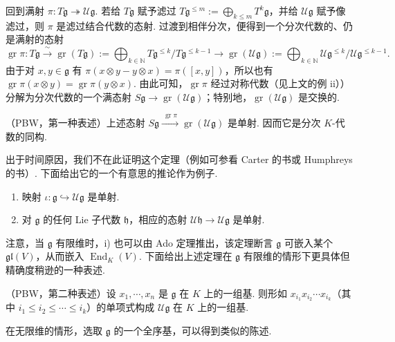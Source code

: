 \begin{numpara}\label{np:ssl-2-2-4}
回到满射 $\pi : T\mathfrak g \twoheadrightarrow \mathcal{U}\mathfrak g$. 若给 $T\mathfrak g$ 赋予滤过 $T\mathfrak g^{\leqslant m} := \bigoplus_{k \leqslant m} T^{k}\mathfrak g$，并给 $\mathcal{U}\mathfrak g$ 赋予像滤过，则 $\pi$ 是滤过结合代数的态射. 过渡到相伴分次，便得到一个分次代数的、仍是满射的态射
\[\operatorname{gr}\pi : T\mathfrak g \xrightarrow{\ \sim\ } \operatorname{gr}(T\mathfrak g) := \bigoplus_{k \in \mathbb{N}} T\mathfrak g^{\leqslant k}/T\mathfrak g^{\leqslant k-1} \longrightarrow \operatorname{gr}(\mathcal{U}\mathfrak g) := \bigoplus_{k \in \mathbb{N}} \mathcal{U}\mathfrak g^{\leqslant k}/\mathcal{U}\mathfrak g^{\leqslant k-1}.\]
由于对 $x, y \in \mathfrak g$ 有 $\pi(x \otimes y - y \otimes x) = \pi([x, y])$，所以也有 $\operatorname{gr}\pi(x \otimes y) = \operatorname{gr}\pi(y \otimes x)$. 由此可知，$\operatorname{gr}\pi$ 经过对称代数（见上文的例 ii））分解为分次代数的一个满态射 $S\mathfrak g \longrightarrow \operatorname{gr}(\mathcal{U}\mathfrak g)$；特别地，$\operatorname{gr}(\mathcal{U}\mathfrak g)$ 是交换的.
\begin{theorem*}
（PBW，第一种表述）上述态射 $S\mathfrak g \xrightarrow{\ \operatorname{gr}\pi\ } \operatorname{gr}(\mathcal{U}\mathfrak g)$ 是单射. 因而它是分次 $K$-代数的同构.
\end{theorem*}
出于时间原因，我们不在此证明这个定理（例如可参看 Carter 的书或 Humphreys 的书）. 下面给出它的一个有意思的推论作为例子.
\begin{corollary*}
\begin{enumerate}[label=\roman*)]
\item 映射 $\iota : \mathfrak g \hookrightarrow \mathcal{U}\mathfrak g$ 是单射.
\item 对 $\mathfrak g$ 的任何 Lie 子代数 $\mathfrak h$，相应的态射 $\mathcal{U}\mathfrak h \longrightarrow \mathcal{U}\mathfrak g$ 是单射.
\end{enumerate}
\end{corollary*}
注意，当 $\mathfrak g$ 有限维时，i) 也可以由 Ado 定理推出，该定理断言 $\mathfrak g$ 可嵌入某个 $\mathfrak{gl}(V)$，从而嵌入 $\operatorname{End}_{K}(V)$.
下面给出上述定理在 $\mathfrak g$ 有限维的情形下更具体但精确度稍逊的一种表述.
\begin{theorem*}
（PBW，第二种表述）设 $x_{1}, \cdots, x_{n}$ 是 $\mathfrak g$ 在 $K$ 上的一组基. 则形如 $x_{i_{1}}x_{i_{2}} \cdots x_{i_{k}}$（其中 $i_{1} \leqslant i_{2} \leqslant \cdots \leqslant i_{k}$）的单项式构成 $\mathcal{U}\mathfrak g$ 在 $K$ 上的一组基.
\end{theorem*}
在无限维的情形，选取 $\mathfrak g$ 的一个全序基，可以得到类似的陈述.
\end{numpara}

